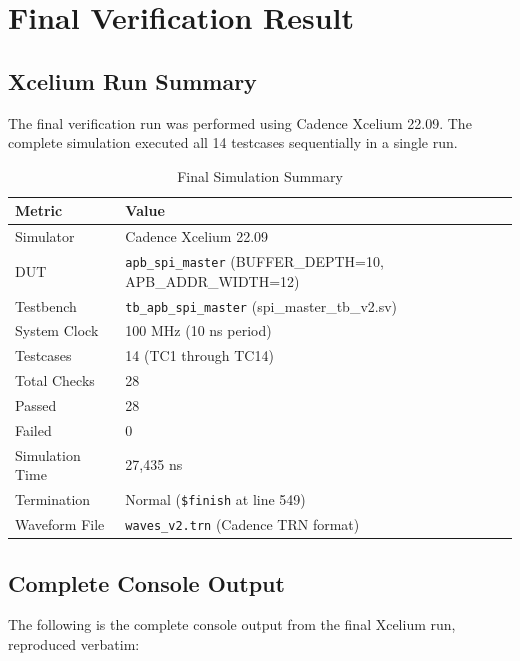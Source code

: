 \chapter{Final Verification Result}
\label{ch:results}

\section{Xcelium Run Summary}

The final verification run was performed using Cadence Xcelium 22.09. The complete simulation
executed all 14 testcases sequentially in a single run.

\begin{table}[H]
\centering
\caption{Final Simulation Summary}
\label{tab:final_summary}
\begin{tabularx}{\textwidth}{@{}lX@{}}
\toprule
\textbf{Metric} & \textbf{Value} \\
\midrule
Simulator       & Cadence Xcelium 22.09 \\
DUT             & \texttt{apb\_spi\_master} (BUFFER\_DEPTH=10, APB\_ADDR\_WIDTH=12) \\
Testbench       & \texttt{tb\_apb\_spi\_master} (spi\_master\_tb\_v2.sv) \\
System Clock    & 100 MHz (10 ns period) \\
Testcases       & 14 (TC1 through TC14) \\
Total Checks    & 28 \\
Passed          & 28 \\
Failed          & 0 \\
Simulation Time & 27,435 ns \\
Termination     & Normal (\texttt{\$finish} at line 549) \\
Waveform File   & \texttt{waves\_v2.trn} (Cadence TRN format) \\
\bottomrule
\end{tabularx}
\end{table}

\section{Complete Console Output}

The following is the complete console output from the final Xcelium run, reproduced verbatim:


